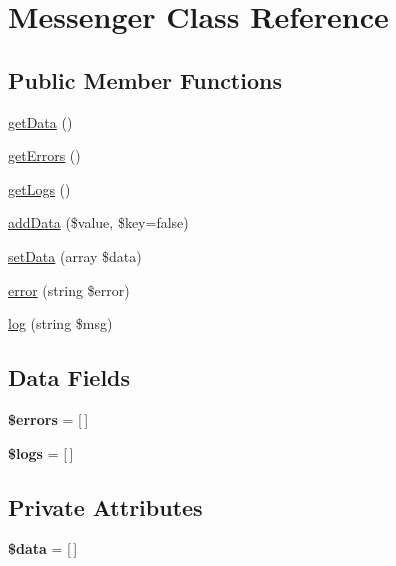 \hypertarget{class_lora_1_1_messenger}{}\section{Messenger Class Reference}
\label{class_lora_1_1_messenger}
\subsection*{Public Member Functions}
\begin{DoxyCompactItemize}
\item 
\hyperlink{class_lora_1_1_messenger_a81a67162a6288d78fc4c55283325f0b4}{get\+Data} ()
\item 
\hyperlink{class_lora_1_1_messenger_a6e548ebf2656742bfd19939ead923ed2}{get\+Errors} ()
\item 
\hyperlink{class_lora_1_1_messenger_a5a1b761c901432b2bfd7fc4e5e75a6bd}{get\+Logs} ()
\item 
\hyperlink{class_lora_1_1_messenger_ae50fa30a5d787c06060bb4b759533d5d}{add\+Data} (\$value, \$key=false)
\item 
\hyperlink{class_lora_1_1_messenger_a87449bdd364c33ff024d32896342bf31}{set\+Data} (array \$data)
\item 
\hyperlink{class_lora_1_1_messenger_a9f1c67f1ddff94d1fc4f665243996ce5}{error} (string \$error)
\item 
\hyperlink{class_lora_1_1_messenger_a0a48838f3bd7b73107241ac3ce7c5f02}{log} (string \$msg)
\end{DoxyCompactItemize}
\subsection*{Data Fields}
\begin{DoxyCompactItemize}
\item 
\mbox{\label{class_lora_1_1_messenger_ab24faf4aa647cdcee494fc48524ad4ff}} 
{\bfseries \$errors} = \mbox{[}$\,$\mbox{]}
\item 
\mbox{\label{class_lora_1_1_messenger_a1985bbbc5349038a012f02c97f5276e6}} 
{\bfseries \$logs} = \mbox{[}$\,$\mbox{]}
\end{DoxyCompactItemize}
\subsection*{Private Attributes}
\begin{DoxyCompactItemize}
\item 
\mbox{\label{class_lora_1_1_messenger_a6efc15b5a2314dd4b5aaa556a375c6d6}} 
{\bfseries \$data} = \mbox{[}$\,$\mbox{]}
\end{DoxyCompactItemize}


